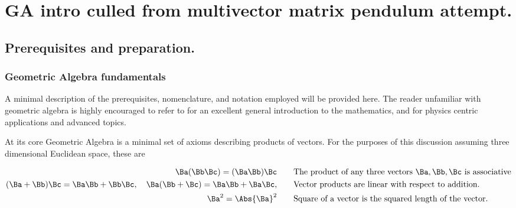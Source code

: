 

\chapter{GA intro culled from multivector matrix pendulum attempt.}
\label{chap:gaMintro}
{}
\date{Nov 26, 2009}

\beginArtWithToc

\section{Prerequisites and preparation.}

\subsection{Geometric Algebra fundamentals}

A minimal description of the prerequisites, nomenclature, and notation employed will be provided here.  The reader unfamiliar with geometric algebra is highly encouraged to refer to \cite{dorst2007gac} for an excellent general introduction to the mathematics, and \cite{doran2003gap} for physics centric applications and advanced topics.

At its core Geometric Algebra is a minimal set of axioms describing products of vectors.  For the purposes of this discussion assuming three dimensional Euclidean space, these are

\begin{axiom}
\begin{subequations}\label{axiom:all}
\begin{align}
\Ba (\Bb \Bc) = (\Ba \Bb) \Bc & \qquad \mbox{The product of any three vectors $\Ba,\Bb,\Bc$ is associative} \\
(\Ba + \Bb) \Bc = \Ba \Bb + \Bb \Bc, \quad
\Ba (\Bb + \Bc) = \Ba \Bb + \Ba \Bc,
 & \qquad \mbox{Vector products are linear with respect to addition.} \\
\Ba^2 = \Abs{\Ba}^2 & \qquad \mbox{Square of a vector is the squared length of the vector.} \label{axiom:contraction}
\end{align}
\end{subequations}
\end{axiom}

